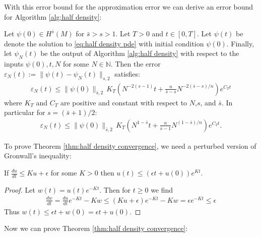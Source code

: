 \documentclass[final,leqno]{siamart}
\begin{document}

With this error bound for the approximation error we can derive an error bound for Algorithm \ref{alg:half density}:

\begin{theorem} \label{thm:half density convergence}
	Let $\psi(0) \in H^{\bar{s}}(M)$ for $\bar{s} > s > 1$.
	Let $T > 0$ and $t \in [0,T]$.
	Let $\psi(t)$ be denote the solution to \eqref{eq:half density pde}
	with initial condition $\psi(0)$.
	Finally, let $\psi_{N}(t)$ be the output of Algorithm \ref{alg:half density}
	with respect to the inputs $\psi(0), t , N$ for some $N \in \mathbb{N}$.
	Then the error $\varepsilon_{N}(t) := \| \psi(t) - \psi_{N}(t) \|_{s,2}$ satisfies:
	\begin{align}
		\varepsilon_{N}(t) \leq \| \psi(0) \|_{\bar{s},2} \, K_{T} \left( N^{-2(s-1)} t+  \frac{n}{\bar{s}-s} N^{-2(\bar{s}-s)/n} \right) e^{C_{T} t}
	\end{align}
	where $K_{T}$ and $C_{T}$ are positive and constant with respect to $N$,$s$, and $\bar{s}$.
	In particular for $s = (\bar{s}+1)/2$:
	\begin{align}
			\varepsilon_{N}(t) \leq \| \psi(0) \|_{\bar{s},2} \, K_{T} \left( N^{1-\bar{s}} t+  \frac{n}{\bar{s}-1} N^{(1-\bar{s})/n} \right) e^{C_{T} t}.
	\end{align}
\end{theorem}

\noindent To prove Theorem \ref{thm:half density convergence}, we need a perturbed version of Gronwall's inequality:
\begin{lemma} \label{lem:Gronwall}
If $\frac{du}{dt} \leq Ku + \epsilon$ for some $K>0$ then $u(t) \leq (\epsilon t + u(0) ) e^{Kt}$.
\end{lemma}
\begin{proof}
	Let $w (t)= u (t) e^{-Kt}$.  Then for $t \geq 0$ we find
	\begin{align}
		\frac{dw}{dt} = \frac{du}{dt} e^{-Kt} - K w \leq (Ku+\epsilon) e^{-Kt} - Kw = \epsilon e^{-Kt} \leq \epsilon
	\end{align}
	Thus $w(t) \leq \epsilon t + w(0) = \epsilon t + u(0)$.
\end{proof}

Now we can prove Theorem \ref{thm:half density convergence}:
\end{document}
